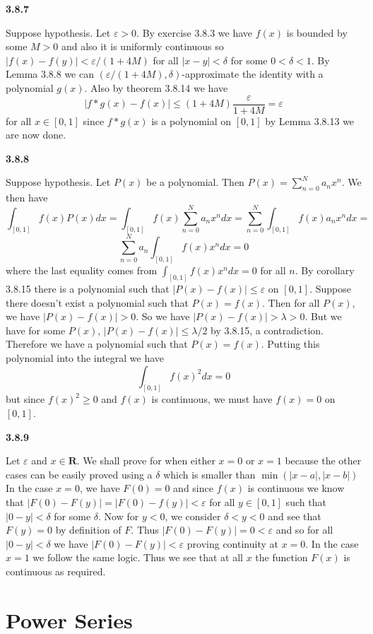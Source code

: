 \documentclass[12pt]{article}
\begin{document}
\textbf{3.8.7}

Suppose hypothesis. Let $\varepsilon>0$. By exercise 3.8.3 we have $f(x)$ is bounded by some $M>0$ and also it is uniformly continuous so $ |f(x)-f(y)| < \varepsilon/(1+4M)$ for all $ |x-y| < \delta$ for some $0< \delta <1$. By Lemma 3.8.8 we can $(\varepsilon/(1+4M), \delta)$-approximate the identity with a polynomial $ g(x)$. Also by theorem 3.8.14 we have
\[\left|f*g(x)-f(x)\right|\leq (1+4M)\frac{\varepsilon}{1+4M}  = \varepsilon\] for all $ x\in [0,1]$ since $ f*g(x)$ is a polynomial on $[0,1]$ by Lemma 3.8.13 we are now done.

\textbf{3.8.8}

Suppose hypothesis. Let $P(x)$ be a polynomial. Then $ P(x) = \sum_{n=0}^Na_nx^n$. We then have 
\[\int_{[0,1]}f(x)P(x)dx =\int_{[0,1]}f(x)\sum_{n=0}^Na_nx^ndx = \sum_{n=0}^N\int_{[0,1]}f(x)a_nx^ndx =  \]
\[\sum_{n=0}^Na_n\int_{[0,1]}f(x)x^ndx = 0\] where the last equality comes from $\int_{[0,1]}f(x)x^ndx  = 0$ for all $n$. By corollary 3.8.15 there is a polynomial such that $ |P(x)-f(x)| \leq \varepsilon$ on $ [0,1]$. Suppose there doesn't exist a polynomial such that $ P(x) = f(x)$. Then for all $P(x)$, we have $ |P(x) - f(x)| > 0$. So we have $ |P(x) -f(x)| > \lambda > 0$. But we have for some $P(x)$, $ |P(x) -f(x)|\leq \lambda/2$ by 3.8.15, a contradiction. Therefore we have a polynomial such that $ P(x) = f(x)$. Putting this polynomial into the integral we have
\[\int_{[0,1]}f(x)^2dx = 0\] but since $f(x)^2\geq0$ and $f(x)$ is continuous, we must have $ f(x) = 0$ on $[0,1]$.

\textbf{3.8.9}

Let $\varepsilon$ and $x\in \textbf{R}$. We shall prove for when either $x=0$ or $x =1$ because the other cases can be easily proved using a $\delta$ which is smaller than $\min(|x-a|,|x-b|)$  In the case $ x =0$, we have $F(0) = 0$ and since $f(x)$ is continuous we know that $ |F(0) - F(y)| = |F(0) - f(y)|  < \varepsilon$ for all $y\in [0,1]$ such that $|0-y| < \delta$ for some $\delta$. Now for $ y < 0$, we consider $\delta<y<0$ and see that $ F(y) = 0$ by definition of $F$. Thus $ |F(0)-F(y)| = 0 < \varepsilon$ and so for all $ |0-y| < \delta$ we have $|F(0)-F(y)| < \varepsilon$ proving continuity at $ x =0$. In the case $ x = 1$ we follow the same logic. Thus we see that at all $x$ the function $F(x)$ is continuous as required.

\section{Power Series}
\end{document}
